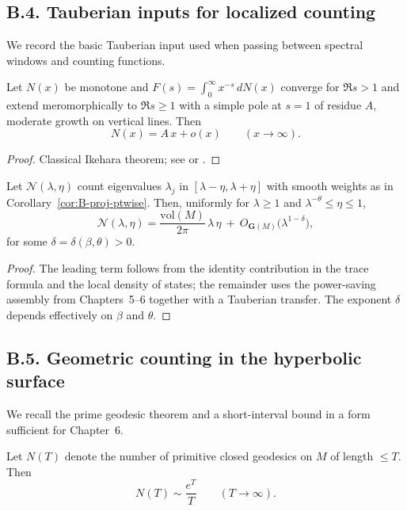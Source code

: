 \bigskip
\subsection*{B.4. Tauberian inputs for localized counting}
\noindent We record the basic Tauberian input used when passing between spectral windows and counting functions.

\begin{lemma}\label{lem:B-Ikehara}
Let \(N(x)\) be monotone and \(F(s)=\int_0^\infty x^{-s}\,dN(x)\) converge for \(\Re s>1\) and extend meromorphically to \(\Re s\ge 1\) with a simple pole at \(s=1\) of residue \(A\), moderate growth on vertical lines. Then
\[
N(x)=A\,x+o(x)\qquad(x\to\infty).
\]
\end{lemma}

\begin{proof}
Classical Ikehara theorem; see \cite[Chap.~III]{Korevaar2004} or \cite[§I.2]{Tenenbaum2015}.
\end{proof}

\begin{corollary}\label{cor:B-local-Weyl}
Let \(\mathcal{N}(\lambda,\eta)\) count eigenvalues \(\lambda_j\) in \([\lambda-\eta,\lambda+\eta]\) with smooth weights as in Corollary~\ref{cor:B-proj-ptwise}. Then, uniformly for \(\lambda\ge 1\) and \(\lambda^{-\theta}\le \eta\le 1\),
\[
\mathcal{N}(\lambda,\eta)=\frac{\mathrm{vol}(M)}{2\pi}\,\lambda\,\eta\ +\ O_{\mathbf{G}(M)}\!\big(\lambda^{1-\delta}\big),
\]
for some \(\delta=\delta(\beta,\theta)>0\).
\end{corollary}

\begin{proof}
The leading term follows from the identity contribution in the trace formula and the local density of states; the remainder uses the power-saving assembly from Chapters~5–6 together with a Tauberian transfer. The exponent \(\delta\) depends effectively on \(\beta\) and \(\theta\).
\end{proof}

\bigskip
\subsection*{B.5. Geometric counting in the hyperbolic surface}
\noindent We recall the prime geodesic theorem and a short-interval bound in a form sufficient for Chapter~6.

\begin{lemma}\label{lem:B-PGT}
Let \(N(T)\) denote the number of primitive closed geodesics on \(M\) of length \(\le T\). Then
\[
N(T)\sim \frac{e^{T}}{T}\qquad(T\to\infty).
\]
\end{lemma}


